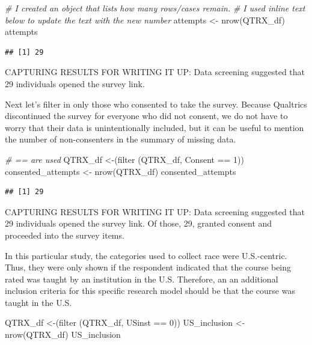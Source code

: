 \documentclass[
  english,
]{book}
\newenvironment{Shaded}{\begin{snugshade}}{\end{snugshade}}
\newcommand{\CommentTok}[1]{\textcolor[rgb]{0.56,0.35,0.01}{\textit{#1}}}
\newcommand{\DecValTok}[1]{\textcolor[rgb]{0.00,0.00,0.81}{#1}}
\newcommand{\FunctionTok}[1]{\textcolor[rgb]{0.00,0.00,0.00}{#1}}
\newcommand{\NormalTok}[1]{#1}
\newcommand{\OtherTok}[1]{\textcolor[rgb]{0.56,0.35,0.01}{#1}}
\newcommand{\SpecialCharTok}[1]{\textcolor[rgb]{0.00,0.00,0.00}{#1}}
\begin{document}
\begin{Shaded}
\begin{Highlighting}[]
\CommentTok{\# I created an object that lists how many rows/cases remain.}
\CommentTok{\# I used inline text below to update the text with the new number}
\NormalTok{attempts }\OtherTok{\textless{}{-}} \FunctionTok{nrow}\NormalTok{(QTRX\_df)}
\NormalTok{attempts}
\end{Highlighting}
\end{Shaded}

\begin{verbatim}
## [1] 29
\end{verbatim}

CAPTURING RESULTS FOR WRITING IT UP: Data screening suggested that 29 individuals opened the survey link.

Next let's filter in only those who consented to take the survey. Because Qualtrics discontinued the survey for everyone who did not consent, we do not have to worry that their data is unintentionally included, but it can be useful to mention the number of non-consenters in the summary of missing data.

\begin{Shaded}
\begin{Highlighting}[]
\CommentTok{\# == are used }
\NormalTok{QTRX\_df }\OtherTok{\textless{}{-}}\NormalTok{(}\FunctionTok{filter}\NormalTok{ (QTRX\_df, Consent }\SpecialCharTok{==} \DecValTok{1}\NormalTok{))}
\NormalTok{consented\_attempts }\OtherTok{\textless{}{-}} \FunctionTok{nrow}\NormalTok{(QTRX\_df)}
\NormalTok{consented\_attempts}
\end{Highlighting}
\end{Shaded}

\begin{verbatim}
## [1] 29
\end{verbatim}

CAPTURING RESULTS FOR WRITING IT UP: Data screening suggested that 29 individuals opened the survey link. Of those, 29, granted consent and proceeded into the survey items.

In this particular study, the categories used to collect race were U.S.-centric. Thus, they were only shown if the respondent indicated that the course being rated was taught by an institution in the U.S. Therefore, an an additional inclusion criteria for this specific research model should be that the course was taught in the U.S.

\begin{Shaded}
\begin{Highlighting}[]
\NormalTok{QTRX\_df }\OtherTok{\textless{}{-}}\NormalTok{(}\FunctionTok{filter}\NormalTok{ (QTRX\_df, USinst }\SpecialCharTok{==} \DecValTok{0}\NormalTok{))}
\NormalTok{US\_inclusion }\OtherTok{\textless{}{-}} \FunctionTok{nrow}\NormalTok{(QTRX\_df)}
\NormalTok{US\_inclusion}
\end{Highlighting}
\end{Shaded}
\end{document}

